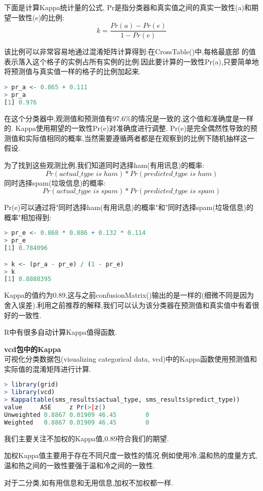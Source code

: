 \documentclass[11pt,a4paper,oneside]{book}
\begin{document}
下面是计算Kappa统计量的公式, Pr是指分类器和真实值之间的真实一致性(a)和期望一致性(e)的比例:
\begin{equation}
k=\frac{Pr(a)-Pr(e)}{1-Pr(e)}
\end{equation}

该比例可以非常容易地通过混淆矩阵计算得到:在CrossTable()中,每格最底部 的值表示落入这个格子的实例占所有实例的比例.因此要计算的一致性Pr(a),只要简单地将预测值与真实值一样的格子的比例加起来.
\begin{lstlisting}[language=r]
> pr_a <- 0.865 + 0.111
> pr_a
[1] 0.976
\end{lstlisting}
在这个分类器中,观测值和预测值有97.6\%的情况是一致的,这个值和准确度是一样的. Kappa使用期望的一致性Pr(e)对准确度进行调整. Pr(e)是完全偶然性导致的预测值和实际值相同的概率,当然需要遵循两者都是在观察到的比例下随机抽样这一假设.

为了找到这些观测比例,我们知道同时选择ham(有用讯息)的概率:
\begin{equation}
Pr(actual\_type\;is\;ham)*Pr(predicted\_type\;is\;ham)
\end{equation}
同时选择spam(垃圾信息)的概率:
\begin{equation}
Pr(actual\_type\;is\;spam)*Pr(predicted\_type\;is\;spam)
\end{equation}

Pr(e)可以通过将"同时选择ham(有用讯息)的概率"和"同时选择spam(垃圾信息)的概率"相加得到:
\begin{lstlisting}[language=r]
> pr_e <- 0.868 * 0.886 + 0.132 * 0.114
> pr_e
[1] 0.784096

> k <- (pr_a - pr_e) / (1 - pr_e)
> k
[1] 0.8888395
\end{lstlisting}
Kappa的值约为0.89,这与之前confusionMatrix()输出的是一样的(细微不同是因为舍入误差).利用之前推荐的解释,我们可以认为该分类器在预测值和真实值中有着很好的一致性.

R中有很多自动计算Kappa值得函数.

\textbf{vcd包中的Kappa}\\
可视化分类数据包(visualizing categorical data, vcd)中的Kappa函数使用预测值和实际值的混淆矩阵进行计算.
\begin{lstlisting}[language=r]
> library(grid)
> library(vcd)
> Kappa(table(sms_results$actual_type, sms_results$predict_type))
value     ASE     z Pr(>|z|)
Unweighted 0.8867 0.01909 46.45        0
Weighted   0.8867 0.01909 46.45        0
\end{lstlisting}
我们主要关注不加权的Kappa值,0.89符合我们的期望.

\begin{tcolorbox}[colback=pink!10!white,colframe=pink!100!black]
加权Kappa值主要用于存在不同尺度一致性的情况.例如使用冷,温和热的度量方式,温和热之间的一致性要强于温和冷之间的一致性.

对于二分类,如有用信息和无用信息,加权不加权都一样.
\end{tcolorbox}
\end{document}
